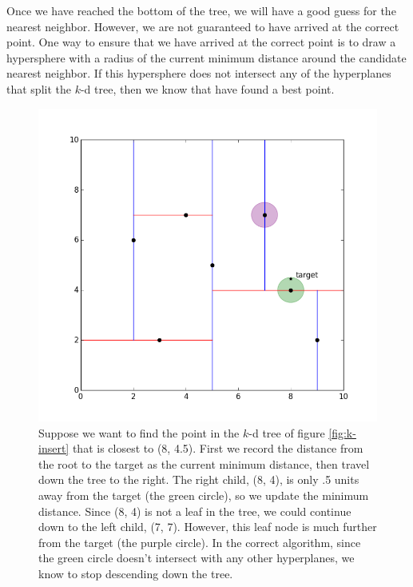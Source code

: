 Once we have reached the bottom of the tree, we will have a good guess for the nearest neighbor.
However, we are not guaranteed to have arrived at the correct point.
One way to ensure that we have arrived at the correct point is to draw a hypersphere with a radius of the current minimum distance around the candidate nearest neighbor.
If this hypersphere does not intersect any of the hyperplanes that split the $k$-d tree, then we know that have found a best point.

\begin{figure}[H]
\includegraphics[width=\textwidth]{kdpic3.png}
\caption{Suppose we want to find the point in the $k$-d tree of figure \ref{fig:k-insert} that is closest to (8, 4.5). First we record the distance from the root to the target as the current minimum distance, then travel down the tree to the right. The right child, (8, 4), is only .5 units away from the target (the green circle), so we update the minimum distance. Since (8, 4) is not a leaf in the tree, we could continue down to the left child, (7, 7). However, this leaf node is much further from the target (the purple circle). In the correct algorithm, since the green circle doesn't intersect with any other hyperplanes, we know to stop descending down the tree.}
\label{fig:bad-search}
\end{figure}

